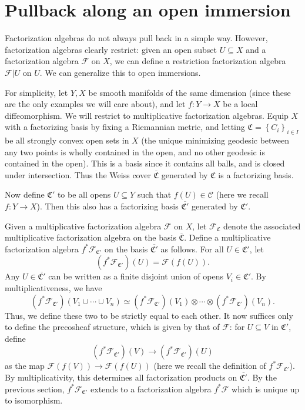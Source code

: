 \section{Pullback along an open immersion}

Factorization algebras do not always pull back in a simple way. However, factorization algebras clearly restrict: given an open subset $U\subseteq X$ and a factorization algebra $\mathcal{F} $ on $X$, we can define a restriction factorization algebra $\mathcal{F} |U$ on $U$. We can generalize this to open immersions.

For simplicity, let $Y,X$ be smooth manifolds of the same dimension (since these are the only examples we will care about), and let $f : Y \to X$ be a local diffeomorphism. We will restrict to multiplicative factorization algebras. Equip $X$ with a factorizing basis by fixing a Riemannian metric, and letting $\mathfrak{C} =\left\{ C_i \right\} _{i\in I} $ be all strongly convex open sets in $X$ (the unique minimizing geodesic between any two points is wholly contained in the open, and no other geodesic is contained in the open). This is a basis since it contains all balls, and is closed under intersection. Thus the Weiss cover $\overline{\mathfrak{C} } $ generated by $\mathfrak{C} $ is a factorizing basis.

Now define $\mathfrak{C} '$ to be all opens $U\subseteq Y$ such that $f(U)\in \mathcal{C} $ (here we recall $f : Y \to X$). Then this also has a factorizing basis $\overline{\mathfrak{C} '} $ generated by $\mathfrak{C} '$.

Given a multiplicative factorization algebra $\mathcal{F} $ on $X$, let $\mathcal{F} _{\mathfrak{C} } $ denote the associated multiplicative factorization algebra on the basis $\overline{\mathfrak{C} } $. Define a multiplicative factorization algebra $f^*\mathcal{F} _{\mathfrak{C} '} $ on the basis $\overline{\mathfrak{C} '} $ as follows. For all $U\in \mathfrak{C} '$, let
\[
	(f^*\mathcal{F} _{\mathfrak{C} '} )(U) = \mathcal{F} (f(U))
.\]
Any $U\in \overline{\mathfrak{C} '} $ can be written as a finite disjoint union of opens $V_i\in \mathfrak{C} '$. By multiplicativeness, we have
\[
	(f^*\mathcal{F} _{\mathfrak{C} '} )(V_1 \cup \cdots \cup V_n) \simeq (f^*\mathcal{F} _{\mathfrak{C} '} )(V_1)\otimes \cdots \otimes (f^*\mathcal{F} _{\mathfrak{C} '} )(V_n)
.\]
Thus, we define these two to be strictly equal to each other. It now suffices only to define the precosheaf structure, which is given by that of $\mathcal{F} $: for $U\subseteq V$ in $\mathfrak{C} '$, define
\[
	(f^*\mathcal{F} _{\mathfrak{C} '} )(V) \to (f^*\mathcal{F} _{\mathfrak{C} '} )(U)
\]
as the map $\mathcal{F} (f(V)) \to \mathcal{F} (f(U))$ (here we recall the definition of $f^*\mathcal{F}_{\mathfrak{C} '} $). By multiplicativity, this determines all factorization products on $\overline{\mathfrak{C} '} $. By the previous section, $f^*\mathcal{F} _{\mathfrak{C} '} $ extends to a factorization algebra $f^*\mathcal{F} $ which is unique up to isomorphism.

